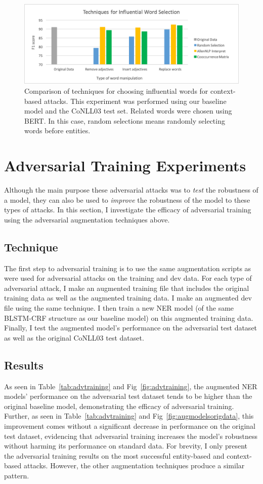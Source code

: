  \begin{figure}[h]
	\centering
	\includegraphics[width=0.85\linewidth]{LatexDiss/figures/influentialwords.png}
	\caption{Comparison of techniques for choosing influential words for context-based attacks. This experiment was performed using our baseline model and the CoNLL03 test set. Related words were chosen using BERT. In this case, random selections means randomly selecting words before entities.}
	\label{fig:influentialwords}
\end{figure}

\section{Adversarial Training Experiments}
Although the main purpose these adversarial attacks was to \textit{test} the robustness of a model, they can also be used to \textit{improve} the robustness of the model to these types of attacks. In this section, I investigate the efficacy of adversarial training using the adversarial augmentation techniques above. 

\subsection{Technique}
The first step to adversarial training is to use the same augmentation scripts as were used for adversarial attacks on the training and dev data. For each type of adversarial attack, I make an augmented training file that includes the original training data as well as the augmented training data. I make an augmented dev file using the same technique. I then train a new NER model (of the same BLSTM-CRF structure as our baseline model) on this augmented training data. Finally, I test the augmented model's performance on the adversarial test dataset as well as the original CoNLL03 test dataset. 

\subsection{Results}
As seen in Table~\ref{tab:advtraining} and Fig~\ref{fig:advtraining}, the augmented NER models' performance on the adversarial test dataset tends to be higher than the original baseline model, demonstrating the efficacy of adversarial training. Further, as seen in Table~\ref{tab:advtraining} and Fig~\ref{fig:augmodelsorigdata}, this improvement comes without a significant decrease in performance on the original test dataset, evidencing that adversarial training increases the model's robustness without harming its performance on standard data. For brevity, I only present the adversarial training results on the most successful entity-based and context-based attacks. However, the other augmentation techniques produce a similar pattern.

